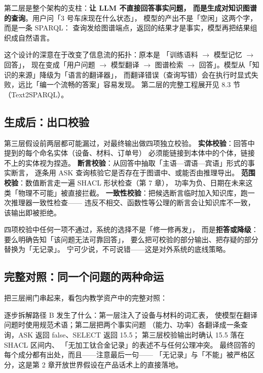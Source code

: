 第二层是整个架构的支柱：\textbf{让 LLM 不直接回答事实问题，
而是生成对知识图谱的查询}。用户问「3 号车床现在什么状态」，
模型的产出不是「空闲」这两个字，而是一条 SPARQL：
查询发给图谱端点，返回的结果才是事实，模型再把结果组织成自然语言。

这个设计的深意在于改变了信息流的拓扑：原本是
「训练语料 \(\rightarrow\) 模型记忆 \(\rightarrow\) 回答」，
现在变成「用户问题 \(\rightarrow\) 模型翻译 \(\rightarrow\)
图谱检索 \(\rightarrow\) 回答」。模型从「知识的来源」降级为「语言的翻译器」，
而翻译错误（查询写错）会在执行时显式失败，远比「编一个流畅的答案」容易发现。
第二层的完整工程展开见 8.3 节（Text2SPARQL）。

\subsection{生成后：出口校验}

第三层假设前两层都可能漏过，对最终输出做四项独立校验。
\textbf{实体校验}：回答中提到的每个命名实体（设备、材料、订单号）
必须能链接到本体中的个体，链接不上的实体视为捏造。
\textbf{断言校验}：从回答中抽取「主语—谓语—宾语」形式的事实断言，
逐条用 ASK 查询核验它是否存在于图谱中、或能否由推理导出。
\textbf{范围校验}：数值断言走一遍 SHACL 形状检查（第 7 章），
功率为负、日期在未来这类「物理不可能」被直接拦截。
\textbf{一致性校验}：把候选断言临时加入知识库，跑一次推理器一致性检查——
违反不相交、函数性等公理的断言会让知识库不一致，该输出即被拒绝。

四项校验中任何一项不通过，系统的选择不是「修一修再发」，
而是\textbf{拒答或降级}：要么明确告知「该问题无法可靠回答」，
要么把可校验的部分输出、把存疑的部分替换为「无记录」。
宁可少说，不可说错——这是对外系统的底线策略。

\subsection{完整对照：同一个问题的两种命运}

把三层闸门串起来，看包内教学资产中的完整对照：



逐步拆解路径 B 发生了什么：第一层注入了设备与材料的词汇表，
使模型在翻译问题时使用规范术语；第二层把两个事实问题
（能力、功率）各翻译成一条查询，ASK 返回 false、SELECT 返回 15.5；
第三层校验输出时确认 15.5 落在 SHACL 区间内、
「无加工钛合金记录」的表述不与任何公理冲突。
最终回答的每个成分都有出处，而且——注意最后一句——
「无记录」与「不能」被严格区分，这是第 2 章开放世界假设在产品话术上的直接落地。

